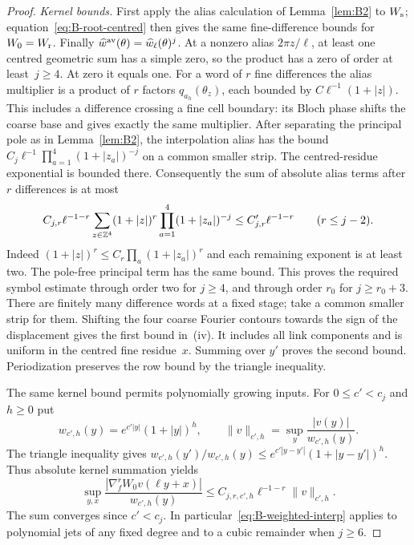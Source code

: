 \begin{proof}
\emph{Kernel bounds.} First apply the alias calculation of Lemma~\ref{lem:B2} to $W_{\rm s}$; equation~\eqref{eq:B-root-centred} then gives the same fine-difference bounds for $W_0=W_{\rm r}$. Finally $\widehat w^{\rm av}(\theta)=\widehat w_\ell(\theta)^j$. At a nonzero alias $2\pi z/\ell$, at least one centred geometric sum has a simple zero, so the product has a zero of order at least~$j\ge4$. At zero it equals one. For a word of $r$ fine differences the alias multiplier is a product of $r$ factors $q_{a_h}(\theta_z)$, each bounded by $C\ell^{-1}(1+|z|)$. This includes a difference crossing a fine cell boundary: its Bloch phase shifts the coarse base and gives exactly the same multiplier. After separating the principal pole as in Lemma~\ref{lem:B2}, the interpolation alias has the bound $C_j\ell^{-1}\prod_{a=1}^4(1+|z_a|)^{-j}$ on a common smaller strip. The centred-residue exponential is bounded there. Consequently the sum of absolute alias terms after $r$ differences is at most
\begin{equation*}
C_{j,r}\ell^{-1-r}\sum_{z\in\mathbb{Z}^4}(1+|z|)^r
 \prod_{a=1}^4(1+|z_a|)^{-j}
\le C'_{j,r}\ell^{-1-r}\qquad(r\le j-2).
\end{equation*}
Indeed $(1+|z|)^r\le C_r\prod_a(1+|z_a|)^r$ and each remaining exponent is at least two. The pole-free principal term has the same bound. This proves the required symbol estimate through order two for $j\ge4$, and through order $r_0$ for $j\ge r_0+3$. There are finitely many difference words at a fixed stage; take a common smaller strip for them. Shifting the four coarse Fourier contours towards the sign of the displacement gives the first bound in~(iv). It includes all link components and is uniform in the centred fine residue~$x$. Summing over $y'$ proves the second bound. Periodization preserves the row bound by the triangle inequality.

The same kernel bound permits polynomially growing inputs. For $0\le c'<c_j$ and $h\ge0$ put
\begin{equation*}
w_{c',h}(y)=e^{c'|y|}(1+|y|)^h,\qquad
\|v\|_{c',h}=\sup_y\frac{|v(y)|}{w_{c',h}(y)}.
\end{equation*}
The triangle inequality gives $w_{c',h}(y')/w_{c',h}(y)\le e^{c'|y-y'|}(1+|y-y'|)^h$. Thus absolute kernel summation yields
\begin{equation}\label{eq:B-weighted-interp}
\sup_{y,x}\frac{|\nabla_f^rW_0v(\ell y+x)|}{w_{c',h}(y)}
\le C_{j,r,c',h}\ell^{-1-r}\|v\|_{c',h}.
\end{equation}
The sum converges since $c'<c_j$. In particular~\eqref{eq:B-weighted-interp} applies to polynomial jets of any fixed degree and to a cubic remainder when $j\ge6$.
\end{proof}

